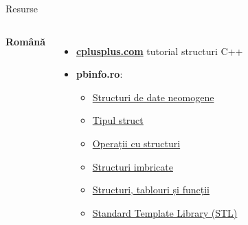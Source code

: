 ﻿\documentclass{beamer}
\begin{document}
\begin{frame}{Resurse}
  \begin{columns}[T]
    \textbf{Română}
    \begin{itemize}\footnotesize\itemsep1pt
      \item \href{https://cplusplus.com/doc/tutorial/structures/}{\textbf{cplusplus.com}}
            \textemdash{} tutorial structuri C++
      \item \textbf{pbinfo.ro}:
      \begin{itemize}\tiny\itemsep0pt
        \item \href{https://www.pbinfo.ro/articole/7652/structuri-de-date-neomogene-in-cpp}{Structuri de date neomogene}
        \item \href{https://www.pbinfo.ro/articole/7653/tipul-struct}{Tipul struct}
        \item \href{https://www.pbinfo.ro/articole/7654/operatii-cu-structuri}{Operații cu structuri}
        \item \href{https://www.pbinfo.ro/articole/7655/structuri-imbricate}{Structuri imbricate}
        \item \href{https://www.pbinfo.ro/articole/7656/structuri-tablouri-si-functii}{Structuri, tablouri și funcții}
        \item \href{https://www.pbinfo.ro/articole/23702/standard-template-library-stl}{Standard Template Library (STL)}
      \end{itemize}
    \end{itemize}


\end{columns}
\end{frame}
\end{document}
